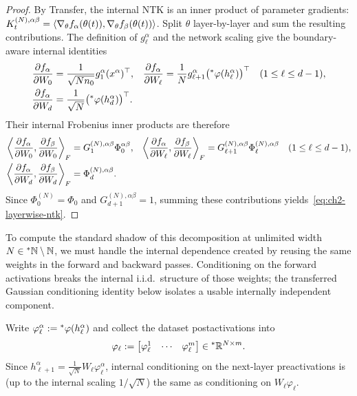 \begin{proof}
By Transfer, the internal NTK is an inner product of parameter gradients: $K_t^{(N),\alpha\beta} = \left\langle \nabla_\theta f_\alpha(\theta(t)), \nabla_\theta f_\beta(\theta(t)) \right\rangle$. Split $\theta$ layer-by-layer and sum the resulting contributions. The definition of $g_\ell^\alpha$ and the network scaling give the boundary-aware internal identities
\begin{equation}\label{eq:ch2-layer-grads}
\begin{aligned}
\frac{\partial f_\alpha}{\partial W_0} &= \frac{1}{\sqrt{N n_0}} g_1^\alpha (x^\alpha)^\top, &
\frac{\partial f_\alpha}{\partial W_\ell} &= \frac{1}{N} g_{\ell+1}^\alpha \bigl({}^*\varphi(h_\ell^\alpha)\bigr)^\top \quad (1 \le \ell \le d-1), \\
\frac{\partial f_\alpha}{\partial W_d} &= \frac{1}{\sqrt{N}} \bigl({}^*\varphi(h_d^\alpha)\bigr)^\top. & &
\end{aligned}
\end{equation}
Their internal Frobenius inner products are therefore
\begin{equation}\label{eq:ch2-layer-frob}
\begin{aligned}
\left\langle \frac{\partial f_\alpha}{\partial W_0}, \frac{\partial f_\beta}{\partial W_0} \right\rangle_F &= G_1^{(N),\alpha\beta} \Phi_0^{\alpha\beta}, &
\left\langle \frac{\partial f_\alpha}{\partial W_\ell}, \frac{\partial f_\beta}{\partial W_\ell} \right\rangle_F &= G_{\ell+1}^{(N),\alpha\beta} \Phi_\ell^{(N),\alpha\beta} \quad (1 \le \ell \le d-1), \\
\left\langle \frac{\partial f_\alpha}{\partial W_d}, \frac{\partial f_\beta}{\partial W_d} \right\rangle_F &= \Phi_d^{(N),\alpha\beta}. & &
\end{aligned}
\end{equation}
Since $\Phi_0^{(N)} = \Phi_0$ and $G_{d+1}^{(N),\alpha\beta} = 1$, summing these contributions yields~\eqref{eq:ch2-layerwise-ntk}.
\end{proof}

To compute the standard shadow of this decomposition at unlimited width $N \in {}^*\mathbb{N} \setminus \mathbb{N}$, we must handle the internal dependence created by reusing the same weights in the forward and backward passes. Conditioning on the forward activations breaks the internal i.i.d.\ structure of those weights; the transferred Gaussian conditioning identity below isolates a usable internally independent component.

Write $\varphi_\ell^\alpha := {}^*\varphi(h_\ell^\alpha)$ and collect the dataset postactivations into
\begin{equation}\label{eq:ch2-postact-mat}
\varphi_\ell := \begin{bmatrix} \varphi_\ell^1 & \cdots & \varphi_\ell^m \end{bmatrix} \in {}^*\mathbb{R}^{N \times m}.
\end{equation}
Since $h_{\ell+1}^\alpha = \frac{1}{\sqrt{N}} W_\ell \varphi_\ell^\alpha$, internal conditioning on the next-layer preactivations is (up to the internal scaling $1/\sqrt{N}$) the same as conditioning on $W_\ell \varphi_\ell$.

